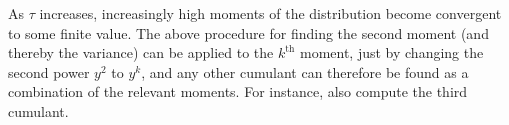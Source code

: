 As $\tau$ increases, increasingly high moments of the distribution become convergent to some finite value. The above procedure for finding the second moment (and thereby the variance) can be applied to the $k^\text{th}$ moment, just by changing the second power $y^2$ to $y^k$, and any other cumulant can therefore be found as a combination of the relevant moments. For instance, \cite{LiuSerota2016} also compute the third cumulant.

